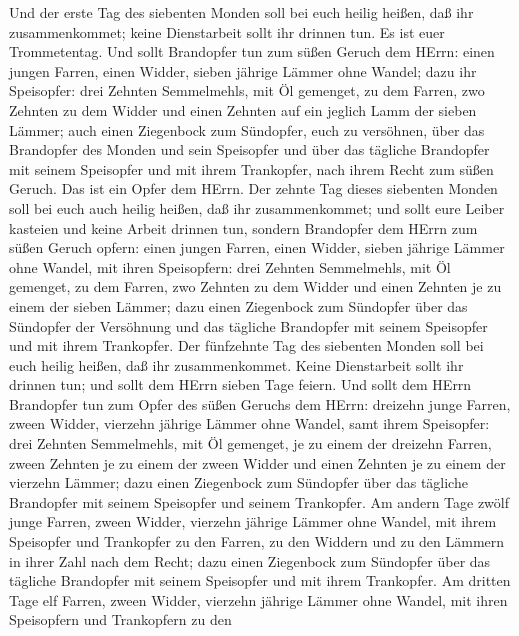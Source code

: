  Und der erste Tag des siebenten Monden soll bei euch heilig
heißen, daß ihr zusammenkommet; keine Dienstarbeit sollt ihr drinnen
tun. Es ist euer Trommetentag.  Und sollt Brandopfer tun zum
süßen Geruch dem HErrn: einen jungen Farren, einen Widder, sieben
jährige Lämmer ohne Wandel;  dazu ihr Speisopfer: drei
Zehnten Semmelmehls, mit Öl gemenget, zu dem Farren, zwo Zehnten zu dem
Widder  und einen Zehnten auf ein jeglich Lamm der sieben
Lämmer;  auch einen Ziegenbock zum Sündopfer, euch zu
versöhnen,  über das Brandopfer des Monden und sein
Speisopfer und über das tägliche Brandopfer mit seinem Speisopfer und
mit ihrem Trankopfer, nach ihrem Recht zum süßen Geruch. Das ist ein
Opfer dem HErrn.  Der zehnte Tag dieses siebenten Monden
soll bei euch auch heilig heißen, daß ihr zusammenkommet; und sollt eure
Leiber kasteien und keine Arbeit drinnen tun,  sondern
Brandopfer dem HErrn zum süßen Geruch opfern: einen jungen Farren, einen
Widder, sieben jährige Lämmer ohne Wandel,  mit ihren
Speisopfern: drei Zehnten Semmelmehls, mit Öl gemenget, zu dem Farren,
zwo Zehnten zu dem Widder  und einen Zehnten je zu einem
der sieben Lämmer;  dazu einen Ziegenbock zum Sündopfer
über das Sündopfer der Versöhnung und das tägliche Brandopfer mit seinem
Speisopfer und mit ihrem Trankopfer.  Der fünfzehnte Tag
des siebenten Monden soll bei euch heilig heißen, daß ihr
zusammenkommet. Keine Dienstarbeit sollt ihr drinnen tun; und sollt dem
HErrn sieben Tage feiern.  Und sollt dem HErrn Brandopfer
tun zum Opfer des süßen Geruchs dem HErrn: dreizehn junge Farren, zween
Widder, vierzehn jährige Lämmer ohne Wandel,  samt ihrem
Speisopfer: drei Zehnten Semmelmehls, mit Öl gemenget, je zu einem der
dreizehn Farren, zween Zehnten je zu einem der zween Widder
 und einen Zehnten je zu einem der vierzehn Lämmer;
 dazu einen Ziegenbock zum Sündopfer über das tägliche
Brandopfer mit seinem Speisopfer und seinem Trankopfer.  Am
andern Tage zwölf junge Farren, zween Widder, vierzehn jährige Lämmer
ohne Wandel,  mit ihrem Speisopfer und Trankopfer zu den
Farren, zu den Widdern und zu den Lämmern in ihrer Zahl nach dem Recht;
 dazu einen Ziegenbock zum Sündopfer über das tägliche
Brandopfer mit seinem Speisopfer und mit ihrem Trankopfer. 
Am dritten Tage elf Farren, zween Widder, vierzehn jährige Lämmer ohne
Wandel,  mit ihren Speisopfern und Trankopfern zu den
